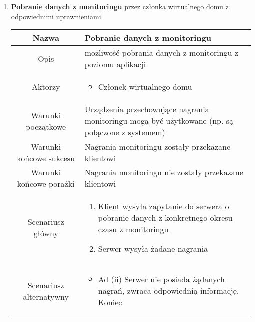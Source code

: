 \documentclass{article}
\begin{document}
\begin{enumerate}
\begin{enumerate}
			\item \textbf{Pobranie danych z monitoringu} przez członka wirtualnego
				domu z odpowiednimi uprawnieniami.
				\begin{table}[H]
					\centering
					\begin{tabular}{|c|p{7cm}|}
						\hline
						Nazwa                   & \textbf{Pobranie danych z monitoringu}                                                                                                                                   \\
						\hline
						Opis                    & możliwość pobrania danych z monitoringu z poziomu aplikacji                                                                                                              \\
						\hline
						Aktorzy                 & \begin{itemize}\item Członek wirtualnego domu\end{itemize}                                                                                                               \\
						\hline
						Warunki początkowe      & Urządzenia przechowujące nagrania monitoringu mogą być użytkowane (np. są połączone z systemem)                                                                          \\
						\hline
						Warunki końcowe sukcesu & Nagrania monitoringu zostały przekazane klientowi                                                                                                                        \\
						\hline
						Warunki końcowe porażki & Nagrania monitoringu nie zostały przekazane klientowi                                                                                                                    \\
						\hline
						Scenariusz główny       & \begin{enumerate}\item Klient wysyła zapytanie do serwera o pobranie danych z konkretnego okresu czasu z monitoringu

\item Serwer wysyła żadane nagrania\end{enumerate} \\
						\hline
						Scenariusz alternatywny & \begin{itemize}\item Ad (ii) Serwer nie posiada żądanych nagrań, zwraca odpowiednią informację. Koniec\end{itemize}                                                      \\
						\hline
					\end{tabular}
				\end{table}
		\end{enumerate}


\end{enumerate}
\end{document}
